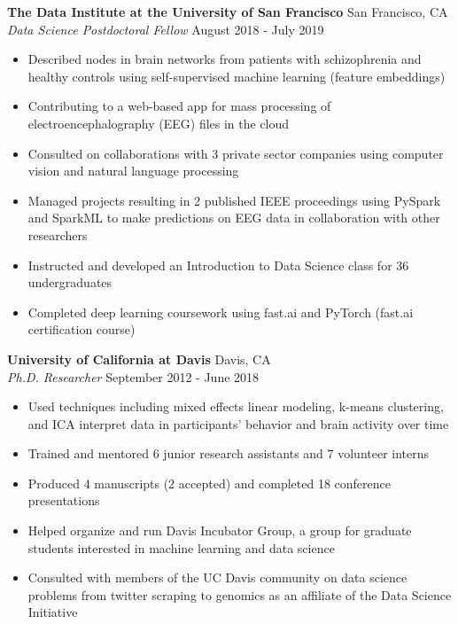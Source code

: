 \documentclass[line,margin,10pt]{res}
\begin{document}
\begin{resume}
\textbf{The Data Institute at the University of San Francisco} \hfill San Francisco, CA \\
{\sl Data Science Postdoctoral Fellow} \hfill August 2018 - July 2019
\begin{itemize} \itemsep -2pt
\item Described nodes in brain networks from patients with schizophrenia and healthy controls using self-supervised machine learning (feature embeddings)
\item Contributing to a web-based app for mass processing of electroencephalography (EEG) files in the cloud
\item Consulted on collaborations with 3 private sector companies using computer vision and natural language processing
\item Managed projects resulting in 2 published IEEE proceedings using PySpark and SparkML to make predictions on EEG data in collaboration with other researchers
\item Instructed and developed an Introduction to Data Science class for 36 undergraduates
\item Completed deep learning coursework using fast.ai and PyTorch (fast.ai certification course)
\end{itemize}

\textbf{University of California at Davis} \hfill Davis, CA \\
{\sl Ph.D. Researcher} \hfill September 2012 - June 2018
\begin{itemize} \itemsep -2pt
\item Used techniques including mixed effects linear modeling, k-means clustering, and ICA interpret data in participants' behavior and brain activity over time
\item Trained and mentored 6 junior research assistants and 7 volunteer interns
\item Produced 4 manuscripts (2 accepted) and completed 18 conference presentations
\item Helped organize and run Davis Incubator Group, a group for graduate students interested in machine learning and data science
\item Consulted with members of the UC Davis community on data science problems from twitter scraping to genomics as an affiliate of the Data Science Initiative
\end{itemize}



\end{resume}
\end{document}

